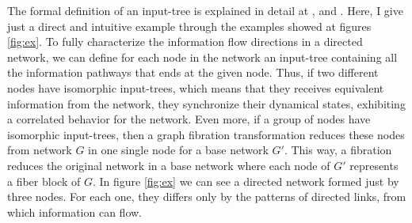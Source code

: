 \documentclass[12pt]{diazessay} %
\begin{document}
The formal definition of an input-tree is explained in detail at \cite{fibration2019}, \cite{Boldi2006} and \cite{Boldi2002}. Here, I give just a direct and intuitive example through the examples showed at figures \ref{fig:ex}. To fully characterize the information flow directions in a directed network, we can define for each node in the network an input-tree containing all the information pathways that ends at the given node. Thus, if two different nodes have isomorphic input-trees, which means that they receives equivalent information from the network, they synchronize their dynamical states, exhibiting a correlated behavior for the network. Even more, if a group of nodes have isomorphic input-trees, then a graph fibration transformation reduces these nodes from network $G$ in one single node for a base network $G'$. This way, a fibration reduces the original network in a base network where each node of $G'$ represents a fiber block of $G$. In figure \ref{fig:ex} we can see a directed network formed just by three nodes. For each one, they differs only by the patterns of directed links, from which information can flow.
\end{document}
